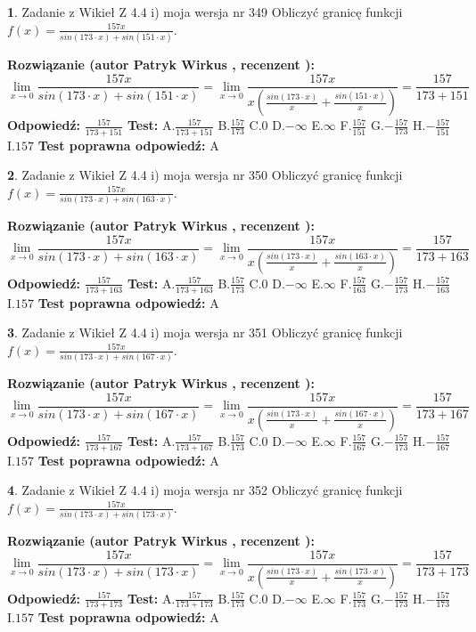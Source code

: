 \documentclass[12pt, a4paper]{article}
\theoremstyle{definition} %
\newtheorem{zad}{}
\newcommand{\zadStart}[1]{\begin{zad}#1\newline}
\newcommand{\zadStop}{\end{zad}}
\newcommand{\rozwStart}[2]{\noindent \textbf{Rozwiązanie (autor #1 , recenzent #2): }\newline}
\newcommand{\rozwStop}{\newline}
\newcommand{\odpStart}{\noindent \textbf{Odpowiedź:}\newline}
\newcommand{\odpStop}{\newline}
\newcommand{\testStart}{\noindent \textbf{Test:}\newline}
\newcommand{\testStop}{\newline}
\newcommand{\kluczStart}{\noindent \textbf{Test poprawna odpowiedź:}\newline}
\newcommand{\kluczStop}{\newline}
\begin{document}
\zadStart{Zadanie z Wikieł Z 4.4 i) moja wersja nr 349}
Obliczyć granicę funkcji $f(x)=\frac{157x}{sin(173\cdot x) +sin(151\cdot x)}$.
\zadStop
\rozwStart{Patryk Wirkus}{}
$$\lim\limits_{x\to 0}\frac{157x}{sin(173\cdot x) +sin(151\cdot x)}=\lim\limits_{x\to 0}\frac{157x}{x(\frac{sin(173\cdot x)}{x}+\frac{sin(151\cdot x)}{x})}=\frac{157}{173+151}$$
\rozwStop
\odpStart
$\frac{157}{173+151}$
\odpStop
\testStart
A.$\frac{157}{173+151}$
B.$\frac{157}{173}$
C.$0$
D.$-\infty$
E.$\infty$
F.$\frac{157}{151}$
G.$-\frac{157}{173}$
H.$-\frac{157}{151}$
I.$157$
\testStop
\kluczStart
A
\kluczStop



\zadStart{Zadanie z Wikieł Z 4.4 i) moja wersja nr 350}
Obliczyć granicę funkcji $f(x)=\frac{157x}{sin(173\cdot x) +sin(163\cdot x)}$.
\zadStop
\rozwStart{Patryk Wirkus}{}
$$\lim\limits_{x\to 0}\frac{157x}{sin(173\cdot x) +sin(163\cdot x)}=\lim\limits_{x\to 0}\frac{157x}{x(\frac{sin(173\cdot x)}{x}+\frac{sin(163\cdot x)}{x})}=\frac{157}{173+163}$$
\rozwStop
\odpStart
$\frac{157}{173+163}$
\odpStop
\testStart
A.$\frac{157}{173+163}$
B.$\frac{157}{173}$
C.$0$
D.$-\infty$
E.$\infty$
F.$\frac{157}{163}$
G.$-\frac{157}{173}$
H.$-\frac{157}{163}$
I.$157$
\testStop
\kluczStart
A
\kluczStop



\zadStart{Zadanie z Wikieł Z 4.4 i) moja wersja nr 351}
Obliczyć granicę funkcji $f(x)=\frac{157x}{sin(173\cdot x) +sin(167\cdot x)}$.
\zadStop
\rozwStart{Patryk Wirkus}{}
$$\lim\limits_{x\to 0}\frac{157x}{sin(173\cdot x) +sin(167\cdot x)}=\lim\limits_{x\to 0}\frac{157x}{x(\frac{sin(173\cdot x)}{x}+\frac{sin(167\cdot x)}{x})}=\frac{157}{173+167}$$
\rozwStop
\odpStart
$\frac{157}{173+167}$
\odpStop
\testStart
A.$\frac{157}{173+167}$
B.$\frac{157}{173}$
C.$0$
D.$-\infty$
E.$\infty$
F.$\frac{157}{167}$
G.$-\frac{157}{173}$
H.$-\frac{157}{167}$
I.$157$
\testStop
\kluczStart
A
\kluczStop



\zadStart{Zadanie z Wikieł Z 4.4 i) moja wersja nr 352}
Obliczyć granicę funkcji $f(x)=\frac{157x}{sin(173\cdot x) +sin(173\cdot x)}$.
\zadStop
\rozwStart{Patryk Wirkus}{}
$$\lim\limits_{x\to 0}\frac{157x}{sin(173\cdot x) +sin(173\cdot x)}=\lim\limits_{x\to 0}\frac{157x}{x(\frac{sin(173\cdot x)}{x}+\frac{sin(173\cdot x)}{x})}=\frac{157}{173+173}$$
\rozwStop
\odpStart
$\frac{157}{173+173}$
\odpStop
\testStart
A.$\frac{157}{173+173}$
B.$\frac{157}{173}$
C.$0$
D.$-\infty$
E.$\infty$
F.$\frac{157}{173}$
G.$-\frac{157}{173}$
H.$-\frac{157}{173}$
I.$157$
\testStop
\kluczStart
A
\kluczStop
\end{document}
